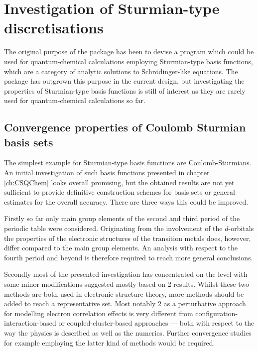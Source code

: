 \section{Investigation of Sturmian-type discretisations}
The original purpose of the \molsturm package has been to devise a program
which could be used for quantum-chemical calculations
employing Sturmian-type basis functions,
which are a category of analytic solutions to Schrödinger-like equations.
The package has outgrown this purpose in the current design,
but investigating the properties of Sturmian-type basis functions is still of interest
as they are rarely used for quantum-chemical calculations so far.

\subsection{Convergence properties of Coulomb Sturmian basis sets}
The simplest example for Sturmian-type basis functions are Coulomb-Sturmians.
An initial investigation of such basis functions presented
in chapter \ref{ch:CSQChem} looks overall promising,
but the obtained results are not yet sufficient to provide definitive
construction schemes for \CS basis sets
or general estimates for the overall accuracy.
There are three ways this could be improved.

Firstly so far only main group elements of the second and third
period of the periodic table were considered.
Originating from the involvement of the $d$-orbitals
the properties of the electronic structures of the transition metals does, however,
differ compared to the main group elements.
An analysis with respect to the fourth period and beyond
is therefore required to reach more general conclusions.

Secondly most of the presented investigation has concentrated on the \HF
level with some minor modifications suggested mostly based on {\MP}2 results.
Whilst these two methods are both used in electronic structure theory,
more methods should be added to reach a representative set.
Most notably {\MP}2 as a perturbative approach
for modelling electron correlation effects is very different from
configuration-interaction-based
or coupled-cluster-based approaches
--- both with respect to the way the physics is described
as well as the numerics.
Further convergence studies for example employing the latter kind of methods
would be required.

